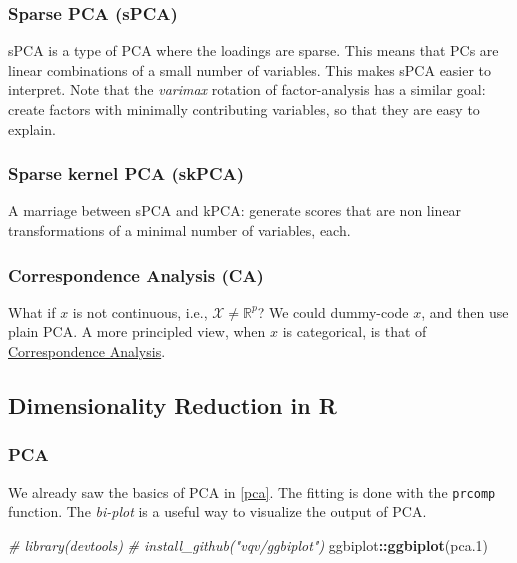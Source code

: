 \documentclass[]{book}
\newenvironment{Shaded}{\begin{snugshade}}{\end{snugshade}}
\newcommand{\KeywordTok}[1]{\textcolor[rgb]{0.13,0.29,0.53}{\textbf{#1}}}
\newcommand{\DecValTok}[1]{\textcolor[rgb]{0.00,0.00,0.81}{#1}}
\newcommand{\CommentTok}[1]{\textcolor[rgb]{0.56,0.35,0.01}{\textit{#1}}}
\newcommand{\OperatorTok}[1]{\textcolor[rgb]{0.81,0.36,0.00}{\textbf{#1}}}
\newcommand{\NormalTok}[1]{#1}
\theoremstyle{definition}
\theoremstyle{definition}
\theoremstyle{definition}
\theoremstyle{remark}
\begin{document}
\subsubsection{Sparse PCA (sPCA)}\label{sparse-pca-spca}

sPCA is a type of PCA where the loadings are sparse. This means that PCs
are linear combinations of a small number of variables. This makes sPCA
easier to interpret. Note that the \emph{varimax} rotation of
factor-analysis has a similar goal: create factors with minimally
contributing variables, so that they are easy to explain.

\subsubsection{Sparse kernel PCA (skPCA)}\label{sparse-kernel-pca-skpca}

A marriage between sPCA and kPCA: generate scores that are non linear
transformations of a minimal number of variables, each.

\subsubsection{Correspondence Analysis
(CA)}\label{correspondence-analysis-ca}

What if \(x\) is not continuous, i.e., \(\mathcal{X}\neq \mathbb{R}^p\)?
We could dummy-code \(x\), and then use plain PCA. A more principled
view, when \(x\) is categorical, is that of
\href{https://en.wikipedia.org/wiki/Correspondence_analysis}{Correspondence
Analysis}.

\subsection{Dimensionality Reduction in
R}\label{dimensionality-reduction-in-r}

\subsubsection{PCA}\label{pca-in-r}

We already saw the basics of PCA in \ref{pca}. The fitting is done with
the \texttt{prcomp} function. The \emph{bi-plot} is a useful way to
visualize the output of PCA.

\begin{Shaded}
\begin{Highlighting}[]
\CommentTok{# library(devtools)}
\CommentTok{# install_github("vqv/ggbiplot")}
\NormalTok{ggbiplot}\OperatorTok{::}\KeywordTok{ggbiplot}\NormalTok{(pca.}\DecValTok{1}\NormalTok{) }
\end{Highlighting}
\end{Shaded}
\end{document}
